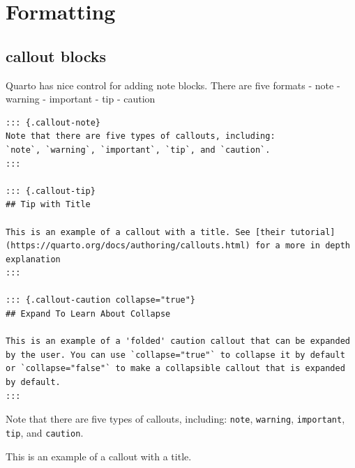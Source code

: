 \documentclass[
  letterpaper,
  DIV=11,
  numbers=noendperiod,
  oneside]{scrartcl}
\begin{document}
\hypertarget{formatting}{%
\section{Formatting}\label{formatting}}

\hypertarget{callout-blocks}{%
\subsection{callout blocks}\label{callout-blocks}}

Quarto has nice control for adding note blocks. There are five formats
 - note - warning - important - tip -
caution

\begin{verbatim}
::: {.callout-note}
Note that there are five types of callouts, including:
`note`, `warning`, `important`, `tip`, and `caution`.
:::

::: {.callout-tip}
## Tip with Title

This is an example of a callout with a title. See [their tutorial](https://quarto.org/docs/authoring/callouts.html) for a more in depth explanation
:::

::: {.callout-caution collapse="true"}
## Expand To Learn About Collapse

This is an example of a 'folded' caution callout that can be expanded by the user. You can use `collapse="true"` to collapse it by default or `collapse="false"` to make a collapsible callout that is expanded by default.
:::
\end{verbatim}

\begin{tcolorbox}[enhanced jigsaw, opacitybacktitle=0.6, toprule=.15mm, arc=.35mm, opacityback=0, bottomrule=.15mm, coltitle=black, colbacktitle=quarto-callout-note-color!10!white, breakable, title=\textcolor{quarto-callout-note-color}{\faInfo}\hspace{0.5em}{Note}, colframe=quarto-callout-note-color-frame, left=2mm, colback=white, leftrule=.75mm, bottomtitle=1mm, toptitle=1mm, titlerule=0mm, rightrule=.15mm]

Note that there are five types of callouts, including: \texttt{note},
\texttt{warning}, \texttt{important}, \texttt{tip}, and
\texttt{caution}.

\end{tcolorbox}

\begin{tcolorbox}[enhanced jigsaw, opacitybacktitle=0.6, toprule=.15mm, arc=.35mm, opacityback=0, bottomrule=.15mm, coltitle=black, colbacktitle=quarto-callout-tip-color!10!white, breakable, title=\textcolor{quarto-callout-tip-color}{\faLightbulb}\hspace{0.5em}{Tip with Title}, colframe=quarto-callout-tip-color-frame, left=2mm, colback=white, leftrule=.75mm, bottomtitle=1mm, toptitle=1mm, titlerule=0mm, rightrule=.15mm]

This is an example of a callout with a title.

\end{tcolorbox}
\end{document}
